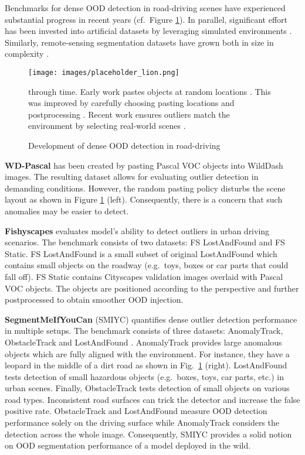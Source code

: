 \documentclass[lettersize,journal,hidelinks]{IEEEtran}
\begin{document}
Benchmarks for dense OOD detection in road-driving scenes have experienced substantial progress in recent years (cf.\ Figure \ref{fig:eval_progress}).
In parallel, significant effort has been invested into artificial datasets by leveraging simulated environments \cite{hendrycks19arxiv,maag22accv}.
Similarly, remote-sensing segmentation datasets have grown  both in size in complexity \cite{carvalho22rs}.
\begin{figure}[ht]
    \centering
    \texttt{[image: images/placeholder\_lion.png]}
    \caption{Development of dense OOD detection in road-driving} through time.
    Early work pastes objects at random locations \cite{bevandic18arxiv}.
    This was  improved by carefully choosing pasting locations and postprocessing \cite{blum21ijcv}. 
    Recent work ensures outliers match the environment by selecting real-world scenes \cite{chan21arxiv}.
    \label{fig:eval_progress}
\end{figure}


\textbf{WD-Pascal}
\cite{bevandic18arxiv} has been created by pasting Pascal VOC \cite{everingham10ijcv} objects into WildDash \cite{zendel18eccv} images.
The resulting dataset allows for evaluating outlier detection in demanding conditions.
However, the random pasting policy disturbs the scene layout as shown in Figure \ref{fig:eval_progress} (left).
Consequently, there is a concern that such anomalies may be easier to detect.

\textbf{Fishyscapes} \cite{blum21ijcv} evaluates model's ability to detect outliers in urban driving scenarios.
The benchmark consists of two datasets: FS LostAndFound and FS Static.
FS LostAndFound is a small subset of original LostAndFound \cite{pinggera16iros} which contains small objects on the roadway (e.g.\ toys, boxes or car parts that could fall off).
FS Static contains Cityscapes validation images overlaid with Pascal VOC objects.
The objects are positioned according to the perspective and further postprocessed to obtain smoother OOD injection.

\textbf{SegmentMeIfYouCan} (SMIYC) \cite{chan21arxiv} quantifies dense outlier detection performance in multiple setups.
The benchmark consists of three datasets: AnomalyTrack, ObstacleTrack and LostAndFound \cite{pinggera16iros}.
AnomalyTrack provides large anomalous objects which are fully aligned with the environment.
For instance, they have a leopard in the middle of a dirt road as shown in Fig.\ \ref{fig:eval_progress} (right).
LostAndFound \cite{pinggera16iros} tests detection of small hazardous objects (e.g.\ boxes, toys, car parts, etc.) in urban scenes.
Finally, ObstacleTrack tests detection of small objects on various road types.
Inconsistent road surfaces can trick the detector and increase the false positive rate.
ObstacleTrack and LostAndFound measure OOD detection performance solely on the driving surface while AnomalyTrack considers the detection across the whole image.
Consequently, SMIYC provides a solid notion on OOD segmentation performance of a model deployed in the wild.
\end{document}
